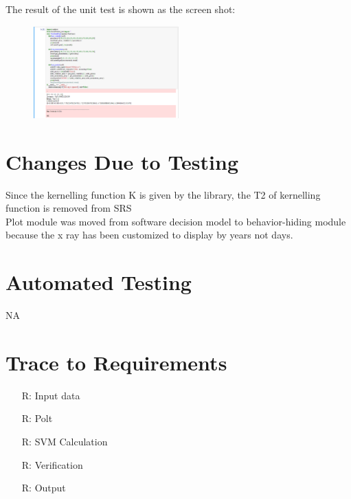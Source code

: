 \documentclass[12pt, titlepage]{article}
\newcounter{reqnum} %
\begin{document}
\begin{enumerate}
The result of the unit test is shown as the screen shot:
~\newline
\begin{figure}[h!]
\begin{center}
{
\includegraphics[width=0.5\textwidth]{unittest.png}
}
\caption{\label{Spark}}
\end{center}
\end{figure}
\end{enumerate} 

\section{Changes Due to Testing}
Since the kernelling function K is given by the library, the T2 of kernelling function is removed from SRS\\
Plot module was moved from software decision model to behavior-hiding module because the x ray has been customized to display by years not days. 

\section{Automated Testing}
NA
\section{Trace to Requirements}

\noindent \begin{itemize}

\item[R\refstepcounter{reqnum}\thereqnum \label{R_Inputs}:] Input data 

\item[R\refstepcounter{reqnum}\thereqnum \label{R_OutputInputs}:] Polt

\item[R\refstepcounter{reqnum}\thereqnum \label{R_Calculate}:] SVM Calculation

\item[R\refstepcounter{reqnum}\thereqnum \label{R_VerifyOutput}:] Verification

\item[R\refstepcounter{reqnum}\thereqnum \label{R_Output}:] Output
\end{itemize}
\end{document}
